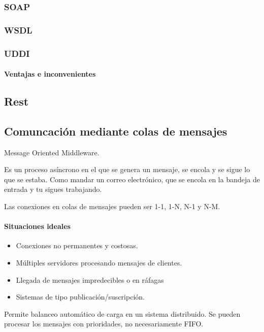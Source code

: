 \documentclass{apuntes}[nochap]
\begin{document}
\subsubsection{SOAP}
\subsubsection{WSDL}
\subsubsection{UDDI}

\paragraph{Ventajas e inconvenientes}

\subsection{Rest}

\subsection{Comuncación mediante colas de mensajes}

\begin{defn}[MOM]
Message Oriented Middleware.

Es un proceso asíncrono en el que se genera un mensaje, se encola y se sigue lo que se estaba. Como mandar un correo electrónico, que se encola en la bandeja de entrada y tu sigues trabajando.
\end{defn}

Las conexiones en colas de mensajes pueden ser 1-1, 1-N, N-1 y N-M.

\paragraph{Situaciones ideales}
\begin{itemize}
 	\item Conexiones no permanentes y costosas.
 	\item Múltiples servidores procesando mensajes de clientes.
 	\item Llegada de mensajes impredecibles o en ráfagas
 	\item Sistemas de tipo publicación/suscripción.
 \end{itemize}
 \obs Permite balanceo automático de carga en un sistema distribuido. Se pueden procesar los mensajes con prioridades, no necesariamente FIFO.
\end{document}
